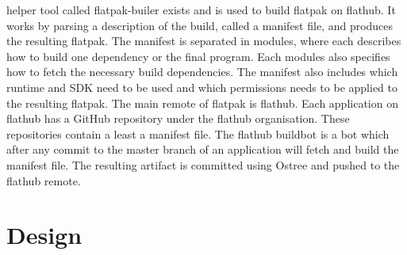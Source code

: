 \documentclass[a4paper,11pt,oneside]{report}
\theoremstyle{definition}
\newcommand{\fp}{flatpak\xspace}
\newcommand{\fh}{flathub\xspace}
\newcommand{\fb}{flatpak-builer\xspace}
\newcommand{\fhbb}{flathub buildbot\xspace}
\begin{document}
helper tool called \fb exists and is used to build \fp on \fh. It works by
parsing a description of the build, called a manifest file, and produces the
resulting \fp. The manifest is separated in modules, where each describes how
to build one dependency or the final program. Each modules also specifies how
to fetch the necessary build dependencies. The manifest also includes which
runtime and SDK need to be used and which permissions needs to be applied to
the resulting \fp. The main remote of \fp is \fh. Each application on \fh has a
GitHub repository under the \fh organisation. These repositories contain a
least a manifest file. The \fhbb is a bot which after any commit to the master
branch of an application will fetch and build the manifest file. The resulting
artifact is committed using Ostree and pushed to the \fh remote.


\chapter{Design}
\label{chap:design}
\end{document}
